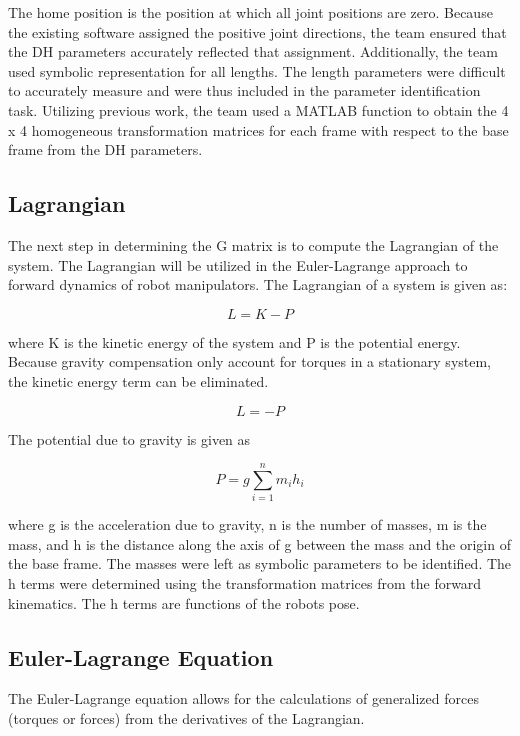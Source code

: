 \documentclass[conference]{IEEEtran}
\begin{document}
The home position is the position at which all joint positions are zero. Because the existing software assigned the positive joint directions, the team ensured that the DH parameters accurately reflected that assignment. Additionally, the team used symbolic representation for all lengths. The length parameters were difficult to accurately measure and were thus included in the parameter identification task. Utilizing previous work, the team used a MATLAB function to obtain the 4 x 4 homogeneous transformation matrices for each frame with respect to the base frame from the DH parameters.

\subsection{Lagrangian}
The next step in determining the G matrix is to compute the Lagrangian of the system. The Lagrangian will be utilized in the Euler-Lagrange approach to forward dynamics of robot manipulators. The Lagrangian of a system is given as:


\begin{equation}
\label{lagrangian}
L = K - P
\end{equation}

where K is the kinetic energy of the system and P is the potential energy. Because gravity compensation only account for torques in a stationary system, the kinetic energy term can be eliminated.

\begin{equation}
\label{lagrangian2}
L = -P
\end{equation}

The potential due to gravity is given as

\begin{equation}
\label{potential}
P = g \sum_{i=1}^n m_i h_i
\end{equation}

where g is the acceleration due to gravity, n is the number of masses, m is the mass, and h is the distance along the axis of g between the mass and the origin of the base frame. The masses were left as symbolic parameters to be identified. The h terms were determined using the transformation matrices from the forward kinematics. The h terms are functions of the robots pose. 


\subsection{Euler-Lagrange Equation}
The Euler-Lagrange equation allows for the calculations of generalized forces (torques or forces) from the derivatives of the Lagrangian.
\end{document}
